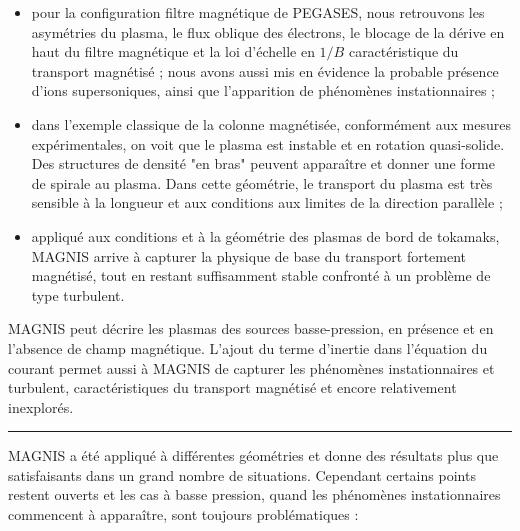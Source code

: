 \begin{itemize}
  \item pour la configuration filtre magnétique de PEGASES, nous retrouvons les
  asymétries du plasma, le flux oblique des électrons, le blocage de la dérive
  en haut du filtre magnétique et la loi d'échelle en $1/B$ caractéristique du
  transport magnétisé ; nous avons aussi mis en évidence la probable présence d'ions
  supersoniques, ainsi que l'apparition de phénomènes instationnaires ;
  \item dans l'exemple classique de la colonne magnétisée, conformément
  aux mesures expérimentales, on voit que le
  plasma est instable et en rotation quasi-solide. Des structures de
  densité "en bras" peuvent apparaître et donner une forme de spirale au
  plasma. Dans cette géométrie, le transport du plasma est très sensible à la
  longueur et aux conditions aux limites de la direction parallèle ;
  \item appliqué aux conditions et à la géométrie des plasmas de bord de
  tokamaks, MAGNIS arrive à capturer la physique de base du transport fortement
  magnétisé, tout en restant suffisamment stable confronté à un problème de type turbulent.
\end{itemize} 

MAGNIS peut décrire les plasmas des sources basse-pression, en présence et en
l'absence de champ magnétique. L'ajout du terme d'inertie dans l'équation du
courant permet aussi à MAGNIS de capturer les phénomènes instationnaires et
turbulent, caractéristiques du transport magnétisé et encore relativement
inexplorés.

\begin{center}
\rule{0.6\textwidth}{1pt}
\end{center}

MAGNIS a été appliqué à différentes géométries et donne des résultats plus que
satisfaisants dans un grand nombre de situations. Cependant certains points
restent ouverts et les cas à basse pression, quand les phénomènes instationnaires
commencent à apparaître, sont toujours problématiques :

